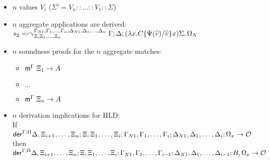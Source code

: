    \begin{itemize}[leftmargin=\secondm]
      \item $n$ values $V_i$ ($\Sigma' = V_n :: \dots :: V_1 :: \Sigma$)
      \item $n$ aggregate applications are derived:\\
      $s_2 = \curvearrowright_{\Xi, \Xi_1, \dotsc, \Xi_n}^{\Gamma_{N1},
      \Gamma_1, \dotsc, \Gamma_n; \Delta_{N1}, \Delta_1, \dotsc,
         \Delta_n} \Gamma; \Delta; (\lambda x.  C\{\Psi(\widehat{v})/\widehat{v}\} x) \Sigma,
            \Omega_N$
      \item $n$ soundness proofs for the $n$ aggregate matches:
      \begin{itemize}[leftmargin=\thirdm]
         \item $\mathsf{m}^{\Gamma} \; \Xi_1 \rightarrow A$
         \item $\dots$
         \item $\mathsf{m}^{\Gamma} \; \Xi_n \rightarrow A$
      \end{itemize}

      \item $n$ derivation implications for HLD: \\
      If $\mathsf{der}^{\Gamma ; \Pi} \Delta, \Xi_{i+1}, \dotsc, \Xi_{n} ; \Xi, \Xi_1,
         \dotsc, \Xi_i; \Gamma_{N1}, \Gamma_1, \dotsc, \Gamma_i; \Delta_{N1},
            \Delta_1, \dotsc, \Delta_i; \Omega_x \rightarrow \mathcal{O}$ then\\
            \hspace{5cm} $\mathsf{der}^{\Gamma ; \Pi} \Delta, \Xi_{i+1}, \dotsc, \Xi_{n} ; \Xi, \Xi_1,
            \dotsc, \Xi_i; \Gamma_{N1}, \Gamma_1, \dotsc, \Gamma_{i-1}; \Delta_{N1},
            \Delta_1, \dotsc, \Delta_{i-1}; B, \Omega_x \rightarrow \mathcal{O}$
   \end{itemize}
